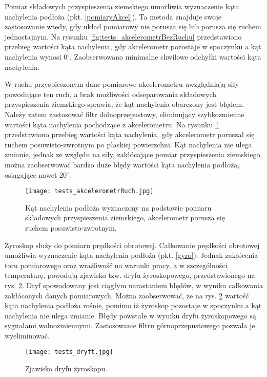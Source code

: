 Pomiar składowych przyspieszenia ziemskiego umożliwia wyznaczenie kąta nachylenia podłoża (pkt. \ref{pomiaryAkcel}). Ta metoda znajduje swoje zastosowanie wtedy, gdy układ pomiarowy nie porusza się lub porusza się ruchem jednostajnym. Na rysunku \ref{fig:tests_akcelerometrBezRuchu} przedstawiono przebieg wartości kąta nachylenia, gdy akcelerometr pozostaje w spoczynku a kąt nachylenia wynosi 0$^{\circ}$. Zaobserwowano minimalne chwilowe odchyłki wartości kąta nachylenia.

W ruchu przyspieszonym dane pomiarowe akcelerometru uwzględniają siły powodujące ten ruch, a brak możliwości odseparowania składowych przyspieszenia ziemskiego sprawia, że kąt nachylenia obarczony jest błędem. Należy zatem zastosować filtr dolnoprzepustowy, eliminujący szybkozmienne wartości kąta nachylenia pochodzące z akcelerometru. Na rysunku \ref{fig:akcelerometrRuch} przedstawiono przebieg wartości kąta nachylenia, gdy akcelerometr poruszał się ruchem posuwisto-zwrotnym po płaskiej powierzchni. Kąt nachylenia nie ulega zmianie, jednak ze względu na siły, zakłócające pomiar przyspieszenia ziemskiego, można zaobserwować bardzo duże błędy wartości kąta nachylenia podłoża, osiągające nawet 20$^{\circ}$.

\begin{figure}[h]
    \centering
    \texttt{[image: tests\_akcelerometrRuch.jpg]}
    \caption{Kąt nachylenia podłoża wyznaczony na podstawie pomiaru składowych przyspieszenia ziemskiego, akcelerometr porusza się ruchem posuwisto-zwrotnym.}
    \label{fig:akcelerometrRuch}
\end{figure}

Żyroskop służy do pomiaru prędkości obrotowej. Całkowanie prędkości obrotowej umożliwia wyznaczenie kąta nachylenia podłoża (pkt. \ref{gyro}). Jednak zakłócenia toru pomiarowego oraz wrażliwość na warunki pracy, a w szczególności temperaturę, powodują zjawisko tzw. dryfu żyroskopowego, przedstawionego na rys. \ref{fig:tests_dryft}. Dryf spowodowany jest ciągłym narastaniem błędów, w wyniku całkowania zakłóconych danych pomiarowych. Można zaobserwować, że na rys. \ref{fig:tests_dryft} wartość kąta nachylenia podłoża rośnie, pomimo iż żyroskop pozostaje w spoczynku a kąt nachylenia nie ulega zmianie. Błędy powstałe w wyniku dryfu żyroskopowego są sygnałami wolnozmiennymi. Zastosowanie filtru górnoprzepustowego pozwala je wyeliminować.
\begin{figure}[h]
    \centering
    \texttt{[image: tests\_dryft.jpg]}
    \caption{Zjawisko dryfu żyroskopu.}
    \label{fig:tests_dryft}
\end{figure}

